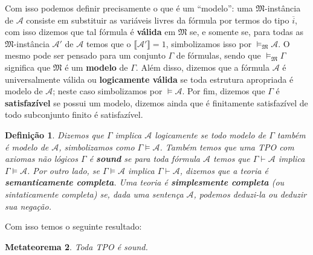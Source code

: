\documentclass[11pt,a4paper]{article}
\newtheorem{mydef}{Definição}[section]
\newtheorem{mthrm}[mydef]{Metateorema}
\theoremstyle{definition}
\begin{document}
Com isso podemos definir precisamente o que é um ``modelo'': uma $\mathfrak{M}$-instância de $\mathscr{A}$ consiste em substituir as variáveis livres da fórmula por termos do tipo $\overline{i}$, com isso dizemos que tal fórmula é \textbf{válida} em  $\mathfrak{M}$ se, e somente se, para todas as $\mathfrak{M}$-instância $\mathscr{A}'$ de $\mathscr{A}$ temos que o $\llbracket \mathscr{A}' \rrbracket=1$, simbolizamos isso por $\vDash_\mathfrak{M} \mathscr{A}$. O mesmo pode ser pensado para um conjunto $\Gamma$ de fórmulas, sendo que $\vDash_\mathfrak{M} \Gamma$ significa que  $\mathfrak{M}$ é um \textbf{modelo} de $\Gamma$. Além disso, dizemos que a fórmula $\mathscr{A}$ é universalmente válida ou \textbf{logicamente válida} se toda estrutura apropriada é modelo de $\mathscr{A}$; neste caso simbolizamos por $\vDash \mathscr{A}$. Por fim, dizemos que $\Gamma$ é \textbf{satisfazível} se possui um modelo, dizemos ainda que é finitamente satisfazível de todo subconjunto finito é satisfazível.

\begin{mydef}
	
	Dizemos que $\Gamma$ implica $\mathscr{A}$ logicamente se todo modelo de $\Gamma$ também é modelo de  $\mathscr{A}$, simbolizamos como $\Gamma \vDash \mathscr{A}$. Também temos que uma TPO com axiomas não lógicos $\Gamma$ é \textbf{sound} se para toda fórmula $\mathscr{A}$ temos que $\Gamma \vdash \mathscr{A}$ implica  $\Gamma \vDash \mathscr{A}$. Por outro lado, se $\Gamma \vDash \mathscr{A}$ implica $\Gamma \vdash \mathscr{A}$, dizemos que a teoria é \textbf{semanticamente completa}. Uma teoria é \textbf{simplesmente completa} (ou sintaticamente completa) se, dada uma sentença $\mathscr{A}$, podemos deduzi-la ou deduzir sua negação.  
	
	
\end{mydef}

Com isso temos o seguinte resultado: 

\begin{mthrm}
	
	Toda TPO é sound.
	
\end{mthrm}
\end{document}
